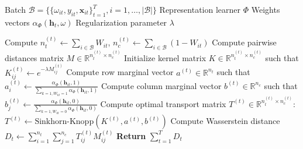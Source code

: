 \documentclass[10pt]{article} %
\begin{document}
\begin{algorithm}
\caption{Weighted Wasserstein Distance Computation}
\label{alg:wasserstein_distance}
\begin{algorithmic}[1]
  \Require Batch $\mathcal{B} = \{\{\omega_{it}, y_{it}, \mathbf{x}_{it}\}_{t=1}^{T}, i=1,\dots,|\mathcal{B}|\}$
  \Require Representation learner $\Phi$
  \Require Weights vectors $\alpha_{\Phi}(\mathbf{h}_t, \omega)$
  \Require Regularization parameter $\lambda$
   
     \State Compute $n_t^{(t)} \gets \sum_{i \in \mathcal{B}} W_{it}$, $n_c^{(t)} \gets \sum_{i \in \mathcal{B}} (1 - W_{it})$
     \State Compute pairwise distances matrix $M \in \mathbb{R}^{n_t^{(t)} \times n_c^{(t)}}$ 
     \State Initialize kernel matrix $K \in \mathbb{R}^{n_t^{(t)} \times n_c^{(t)}}$ such that $K_{ij}^{(t)} \gets e^{-\lambda M_{ij}^{(t)}}$
     \State Compute row marginal vector $a^{(t)} \in \mathbb{R}^{n_t}$ such that $a_i^{(t)} \gets \frac{\alpha_{\Phi}(\mathbf{h}_{it}, 1)}{\sum_{k=1, W_{kt} =1} \alpha_{\Phi}(\mathbf{h}_{it}, 1)}$
     \State Compute column marginal vector $b^{(t)} \in \mathbb{R}^{n_c}$ such that $b_j^{(t)} \gets \frac{\alpha_{\Phi}(\mathbf{h}_{it}, 0)}{\sum_{k=1, W_{kt} =0} \alpha_{\Phi}(\mathbf{h}_{it}, 0)}$
     \State Compute optimal transport matrix $T^{(t)} \in \mathbb{R}^{n_t^{(t)} \times n_c^{(t)}}$: 
     \State \hspace{1cm} $T^{(t)} \gets \text{Sinkhorn-Knopp}(K^{(t)}, a^{(t)}, b^{(t)})$
     \State Compute Wasserstein distance $D_t \gets \sum_{i=1}^{n_t} \sum_{j=1}^{n_c} T_{ij}^{(t)} M_{ij}^{(t)}$
   \EndFor
   \State \textbf{Return} $\sum_{t=1}^{T} D_t$
\end{algorithmic}
\end{algorithm}
\end{document}
